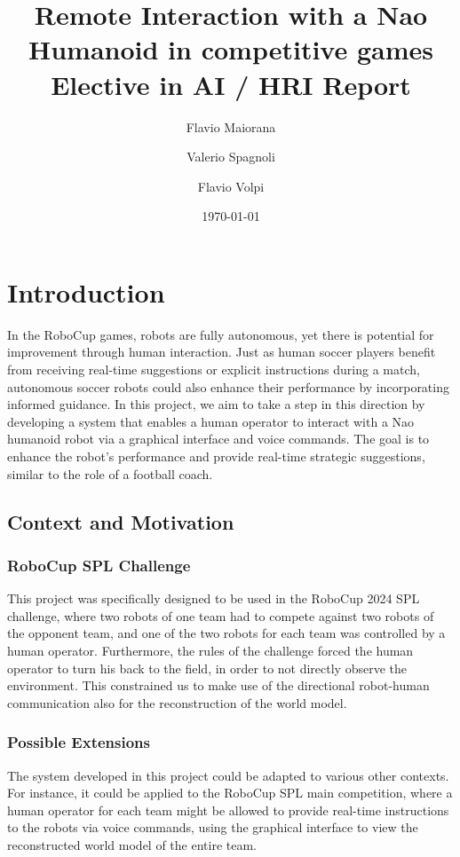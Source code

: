 \documentclass[a4paper, onecolumn, 12pt]{article}
\title{Remote Interaction with a Nao Humanoid in competitive games \\ Elective in AI / HRI Report}
\author{Flavio Maiorana \and Valerio Spagnoli \and Flavio Volpi}
\date{\today}
\begin{document}
\maketitle

\section{Introduction}
\label{sec:intro}
In the RoboCup games, robots are fully autonomous, yet there is potential for 
improvement through human interaction. Just as human soccer players benefit from 
receiving real-time suggestions or explicit instructions during a match, 
autonomous soccer robots could also enhance their performance by incorporating 
informed guidance. 
In this project, we aim to take a step in this direction by developing a 
system that enables a human operator to interact with a Nao humanoid robot via a graphical 
interface and voice commands. The goal is to enhance the robot's performance and 
provide real-time strategic suggestions, similar to the role of a football coach.

\subsection{Context and Motivation}
\label{sec:context}

\subsubsection{RoboCup SPL Challenge}
This project was specifically designed to be used in the RoboCup 2024 SPL challenge, 
where two robots of one team had to compete against two robots of the opponent team, 
and one of the two robots for each team was controlled by a human operator. Furthermore, 
the rules of the challenge forced the human operator to turn his back to the field, 
in order to not directly observe the environment. This constrained us to make use of the
directional robot-human communication also for the reconstruction of the world model.

\subsubsection{Possible Extensions}  
The system developed in this project could be adapted to various other contexts. For instance, 
it could be applied to the RoboCup SPL main competition, where a human operator for each team 
might be allowed to provide real-time instructions to the robots via voice commands, using the 
graphical interface to view the reconstructed world model of the entire team.  
\end{document}
